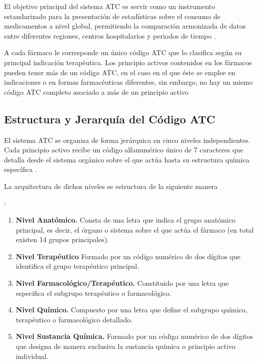 El objetivo principal del sistema ATC es servir como un instrumento estandarizado para la presentación de estadísticas sobre el consumo de medicamentos a nivel global, permitiendo la comparación armonizada de datos entre diferentes regiones, centros hospitalarios y periodos de tiempo \cite{who_atc_methodology}.

A cada fármaco le corresponde un único código ATC que lo clasifica según su principal indicación terapéutica. Los principio activos contenidos en los fármacos pueden tener más de un código ATC, en el caso en el que éste se emplee en indicaciones o en formas farmacéuticas diferentes, sin embargo, no hay un mismo código ATC completo asociado a más de un principio activo\cite{sacyl_uso_racional}

\subsection{Estructura y Jerarquía del Código ATC}
El sistema ATC se organiza de forma jerárquica en cinco niveles independientes. Cada principio activo recibe un código alfanumérico único de 7 caracteres que detalla desde el sistema orgánico sobre el que actúa hasta su estructura química específica \cite{whocc_structure} .

La arquitectura de dichos niveles se estructura de la siguiente manera  \cite{whocc_structure} 

\cite{who_atc_classification} :
\begin{enumerate}
    \item \textbf{Nivel Anatómico.} Consta de una letra que indica el grupo anatómico principal, es decir, el órgano o sistema sobre el que actúa el fármaco (en total existen 14 grupos principales).
    \item \textbf{Nivel Terapéutico} Formado por un código numérico de dos dígitos que identifica el grupo terapéutico principal.
    \item \textbf{Nivel Farmacológico/Terapéutico.} Constituido por una letra que especifica el subgrupo terapéutico o farmacológico.
    \item \textbf{Nivel Químico.} Compuesto por una letra que define el subgrupo químico, terapéutico o farmacológico detallado.
    \item \textbf{Nivel Sustancia Química.} Formado por un código numérico de dos dígitos que designa de manera exclusiva la sustancia química o principio activo individual.
\end{enumerate}

